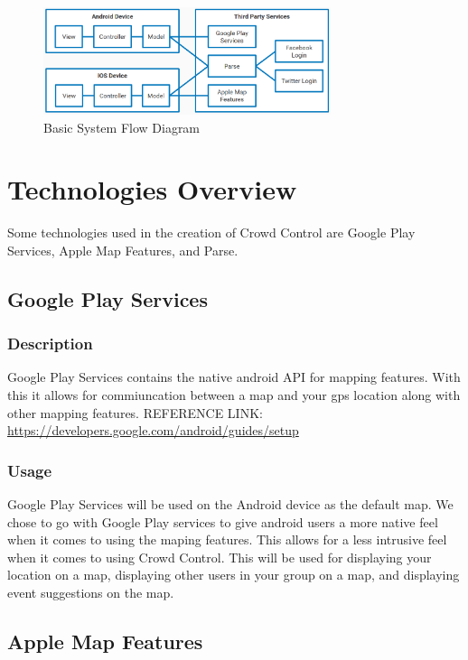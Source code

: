 \begin{figure}[tbh]
\begin{center}
\includegraphics[width=0.75\textwidth]{Additional/designpictures/ModuleFlowDiagram.png}
\end{center}
\caption{Basic System Flow Diagram \label{ModuleFlowDiagram}}
\end{figure}

\section{Technologies Overview}
Some technologies used in the creation of Crowd Control are Google Play Services, Apple Map Features, and Parse.

\subsection{Google Play Services}
	\subsubsection{Description}
	Google Play Services contains the native android API for mapping features. With this it allows for commiuncation between a map and your gps location along with other mapping features.
\newline
REFERENCE LINK:  \url{https://developers.google.com/android/guides/setup}
	\subsubsection{Usage}
	Google Play Services will be used on the Android device as the default map. We chose to go with Google Play services to give android users a more native feel when it comes to using the maping features. This allows for a less intrusive feel when it comes to using Crowd Control. This will be used for displaying your location on a map, displaying other users in your group on a map, and displaying event suggestions on the map.

\subsection{Apple Map Features}
